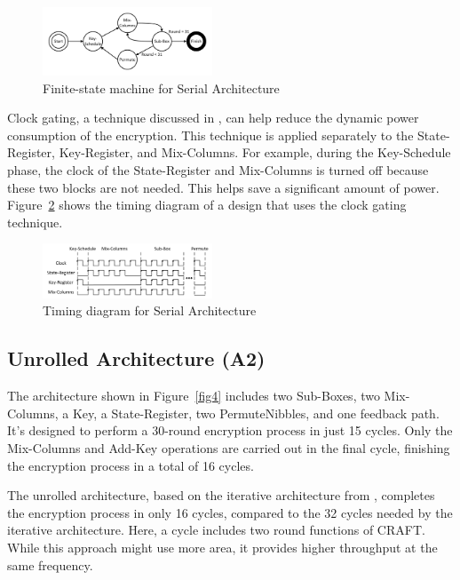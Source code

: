 \documentclass[final,5p,times,twocolumn]{elsarticle}
\begin{document}
\begin{figure}[h]%
    \centering
    \includegraphics[width=0.45\textwidth]{serial-fsm.pdf}
    \caption{Finite-state machine for Serial Architecture}\label{serial_fsm_fig}
\end{figure}

Clock gating, a technique discussed in \cite{shahbazi2020area}, can help reduce the dynamic power consumption of the encryption.
This technique is applied separately to the State-Register, Key-Register, and Mix-Columns.
For example, during the Key-Schedule phase, the clock of the State-Register and Mix-Columns is turned off because these two blocks are not needed.
This helps save a significant amount of power. Figure~\ref{serial_time_diagrm} shows the timing diagram of a design that uses the clock gating technique.

\begin{figure}[h]%
    \centering
    \includegraphics[width=0.45\textwidth]{serial-time.pdf}
    \caption{Timing diagram for Serial Architecture}\label{serial_time_diagrm}
\end{figure}
\subsection{Unrolled Architecture (A2)}\label{subsec3}

The architecture shown in Figure~\ref{fig4} includes two Sub-Boxes, two Mix-Columns, a Key, a State-Register, two PermuteNibbles, and one feedback path. It's designed to perform a 30-round encryption process in just 15 cycles. Only the Mix-Columns and Add-Key operations are carried out in the final cycle, finishing the encryption process in a total of 16 cycles.

The unrolled architecture, based on the iterative architecture from \cite{beierle2019craft}, completes the encryption process in only 16 cycles, compared to the 32 cycles needed by the iterative architecture. Here, a cycle includes two round functions of CRAFT. While this approach might use more area, it provides higher throughput at the same frequency.
\end{document}
